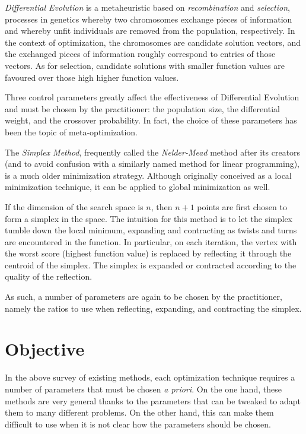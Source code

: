 \documentclass[12pt]{article}
\begin{document}
\emph{Differential Evolution}\cite{storn1997} is a metaheuristic based on
\emph{recombination} and \emph{selection}, processes in genetics whereby
two chromosomes exchange pieces of information and whereby unfit
individuals are removed from the population, respectively.
In the context of optimization, the chromosomes are candidate solution
vectors, and the exchanged pieces of information roughly correspond to
entries of those vectors. As for selection, candidate solutions with
smaller function values are favoured over those high higher function
values.

Three control parameters greatly affect the effectiveness of Differential
Evolution and must be chosen by the practitioner\cite{storn1997}: the
population size, the differential weight, and the crossover probability.
In fact, the choice of these parameters has been the topic of
meta-optimization\cite{pedersen2010}.

The \emph{Simplex Method}\cite{nelder1965}, frequently called the
\emph{Nelder-Mead} method after its creators (and to avoid confusion with a
similarly named method for linear programming), is a much older
minimization strategy. Although originally conceived as a local
minimization technique, it can be applied to global minimization as well.

If the dimension of the search space is $n$, then $n+1$ points are first
chosen to form a simplex in the space. The intuition for this method is to
let the simplex tumble down the local minimum, expanding and contracting as
twists and turns are encountered in the function. In particular, on each
iteration, the vertex with the worst score (highest function value) is
replaced by reflecting it through the centroid of the simplex. The simplex
is expanded or contracted according to the quality of the reflection.

As such, a number of parameters are again to be chosen by the practitioner,
namely the ratios to use when reflecting, expanding, and contracting the
simplex.

\section{Objective}

In the above survey of existing methods, each optimization technique
requires a number of parameters that must be chosen \emph{a priori}. On the
one hand, these methods are very general thanks to the parameters that can
be tweaked to adapt them to many different problems. On the other hand,
this can make them difficult to use when it is not clear how the parameters
should be chosen.
\end{document}
